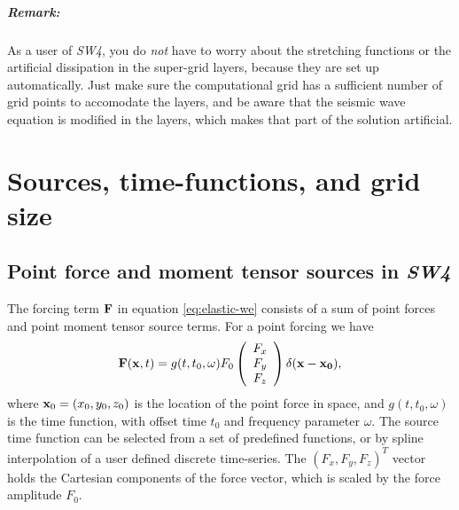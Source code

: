 \documentclass[11pt]{report}
\begin{document}
\paragraph{Remark:} As a user of \emph{SW4}, you do {\em not} have to worry about the 
stretching functions or the artificial dissipation in the super-grid layers, because they are set up
automatically. Just make sure the computational grid has a sufficient number of grid points to
accomodate the layers, and be aware that the seismic wave equation is modified in the layers,
which makes that part of the solution artificial.

\chapter{Sources, time-functions, and grid size}


\section{Point force and moment tensor sources in \emph{SW4}}\label{sec:time-functions}
The forcing term ${\bf F}$ in equation \eqref{eq:elastic-we} consists of a sum of point forces and
point moment tensor source terms. For a point forcing we have
\[
{\bf F}({\bf x},t) = g(t,t_0,\omega) F_0 \left(\begin{array}{c}
  F_x\\ F_y\\ F_z\end{array}\right) \delta ({\bf x} - {\bf x_0}),
\]
where ${\bf x}_0=(x_0,y_0,z_0)$ is the location of the point force in space, and $g(t,t_0,\omega)$
is the time function, with offset time $t_0$ and frequency parameter $\omega$. The source time
function can be selected from a set of predefined functions, or by spline interpolation of a user
defined discrete time-series. The $(F_x,F_y,F_z)^T$ vector holds the Cartesian components of the force
vector, which is scaled by the force amplitude $F_0$. 
\end{document}
